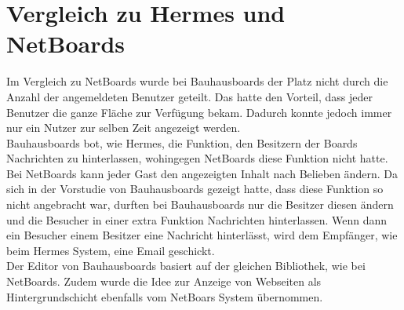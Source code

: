 


















\section{Vergleich zu Hermes und NetBoards}\label{Vergleich zu Hermes und Netboards}
Im Vergleich zu NetBoards wurde bei Bauhausboards der Platz nicht durch die Anzahl der angemeldeten Benutzer geteilt.
Das hatte den Vorteil, dass jeder Benutzer die ganze Fläche zur Verfügung bekam.
Dadurch konnte jedoch immer nur ein Nutzer zur selben Zeit angezeigt werden.
\\
Bauhausboards bot, wie Hermes, die Funktion, den Besitzern der Boards Nachrichten zu hinterlassen, wohingegen NetBoards diese Funktion nicht hatte.
\\
Bei NetBoards kann jeder Gast den angezeigten Inhalt nach Belieben ändern.
Da sich in der Vorstudie von Bauhausboards gezeigt hatte, dass diese Funktion so nicht angebracht war, durften bei Bauhausboards nur die Besitzer diesen ändern und die Besucher in einer extra Funktion Nachrichten hinterlassen.
Wenn dann ein Besucher einem Besitzer eine Nachricht hinterlässt, wird dem Empfänger, wie beim Hermes System, eine Email geschickt.
\\
Der Editor von Bauhausboards basiert auf der gleichen Bibliothek, wie bei NetBoards. Zudem wurde die Idee zur Anzeige von Webseiten als Hintergrundschicht ebenfalls vom NetBoars System übernommen.
